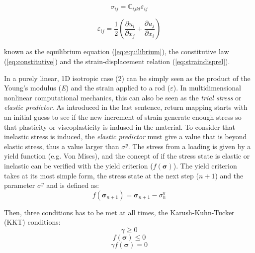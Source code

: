 \documentclass[final,5p,times,twocolumn]{elsarticle}
\begin{document}
\begin{equation}
   \sigma_{ij}=\mathbb{C}_{ijkl} \varepsilon_{ij} \label{eq:constitutive}
\end{equation} 

\begin{equation} \varepsilon_{ij}=\dfrac{1}{2} \left(\dfrac{\partial u_{i}}{\partial x_{j}} 
                + \dfrac{\partial u_{j}}{\partial x_{i}} \right) \label{eq:straindisprel}
\end{equation}

known as the equilibrium equation (\ref{eq:equilibrium}), the constitutive law (\ref{eq:constitutive}) and  the strain-displacement relation (\ref{eq:straindisprel}). 

In a purely linear, 1D isotropic case (2) can be simply seen as the product of the Young's modulus (\textit{E}) and the strain applied to a rod ($\varepsilon$). In multidimensional nonlinear computational mechanics, this can also be seen as the \textit{trial stress} or \textit{elastic predictor}. As introduced in the last sentence, return mapping starts with an initial guess to see if the new increment of strain generate enough stress so that plasticity or viscoplasticity is indused in the material. To consider that inelastic stress is induced, the \textit{elastic predictor} must give a value that is beyond elastic stress, thus a value larger than $\sigma^{y}$. The stress from a loading is given by a yield function (e.g. Von Mises), and the concept of if the stress state is elastic or inelastic can be verified with the yield criterion ($f(\boldsymbol{\sigma})$). The yield criterion takes at its most simple form, the stress state at the next step ($n+1$) and the parameter $\sigma^{y}$ and is defined as:
\begin{equation}
  f (\boldsymbol{\sigma}_{n+1}) = \boldsymbol{\sigma}_{n+1} - \sigma^{y}_{n} \label{eq:yieldcrit_simple}
\end{equation}

Then, three conditions has to be met at all times, the Karush-Kuhn-Tucker (KKT) conditions:
\begin{equation}
  \gamma \geq 0 \label{eq:kkt1}
\end{equation}
\begin{equation}
  f(\boldsymbol{\sigma}) \leq 0 \label{eq:kkt2}
\end{equation}
\begin{equation}
  \gamma f(\boldsymbol{\sigma})  = 0 \label{eq:kkt3}
\end{equation}
\end{document}
